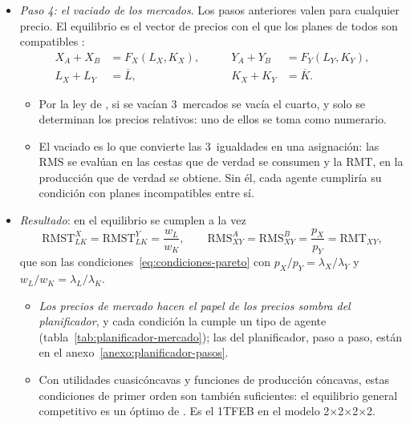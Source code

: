 \documentclass[11pt]{article}
\begin{document}
\begin{itemize}
  \begin{equation}\label{eq:egc-global}
  \frac{p_X}{p_Y}=\frac{\mathrm{PMg}^Y_L}{\mathrm{PMg}^X_L}=\frac{\mathrm{CMg}_X}{\mathrm{CMg}_Y}=\mathrm{RMT}_{XY}.
  \end{equation}
  \begin{itemize}
  \item \emph{Interpretación}: el precio relativo mide lo que le cuesta a la economía una unidad más de $X$ en unidades de $Y$, la pendiente de la FPP.
  \item Junto con el paso~1, $\mathrm{RMS}_{XY}=p_X/p_Y=\mathrm{RMT}_{XY}$: es la \emph{eficiencia global}. Lo que los consumidores están dispuestos a pagar por una unidad más de $X$ coincide con lo que cuesta producirla, sin que ningún consumidor sepa nada de tecnología ni ninguna empresa de preferencias.
  \end{itemize}
\item \emph{Paso 4: el vaciado de los mercados}. Los pasos anteriores valen para cualquier precio. El equilibrio es el vector de precios con el que los planes de todos son compatibles :
  $$\begin{aligned}X_A+X_B&=F_X(L_X,K_X), &\qquad Y_A+Y_B&=F_Y(L_Y,K_Y),\\ L_X+L_Y&=\overline{L}, &\qquad K_X+K_Y&=\overline{K}.\end{aligned}$$
  \begin{itemize}
  \item Por la ley de , si se vacían 3~mercados se vacía el cuarto, y solo se determinan los precios relativos: uno de ellos se toma como numerario.
  \item El vaciado es lo que convierte las 3~igualdades en una asignación: las $\mathrm{RMS}$ se evalúan en las cestas que de verdad se consumen y la $\mathrm{RMT}$, en la producción que de verdad se obtiene. Sin él, cada agente cumpliría su condición con planes incompatibles entre sí.
  \end{itemize}
\item \emph{Resultado}: en el equilibrio se cumplen a la vez
  \begin{equation}\label{eq:egc-condiciones}
  \mathrm{RMST}^X_{LK}=\mathrm{RMST}^Y_{LK}=\frac{w_L}{w_K},\qquad \mathrm{RMS}^A_{XY}=\mathrm{RMS}^B_{XY}=\frac{p_X}{p_Y}=\mathrm{RMT}_{XY},
  \end{equation}
  que son las condiciones~\eqref{eq:condiciones-pareto} con $p_X/p_Y=\lambda_X/\lambda_Y$ y $w_L/w_K=\lambda_L/\lambda_K$.
  \begin{itemize}
  \item \emph{Los precios de mercado hacen el papel de los precios sombra del planificador}, y cada condición la cumple un tipo de agente (tabla~\ref{tab:planificador-mercado}); las del planificador, paso a paso, están en el anexo~\ref{anexo:planificador-pasos}.
  \item Con utilidades cuasicóncavas y funciones de producción cóncavas, estas condiciones de primer orden son también suficientes: el equilibrio general competitivo es un óptimo de . Es el 1TFEB en el modelo 2×2×2×2.\findemo
  \end{itemize}
\end{itemize}
\end{document}
